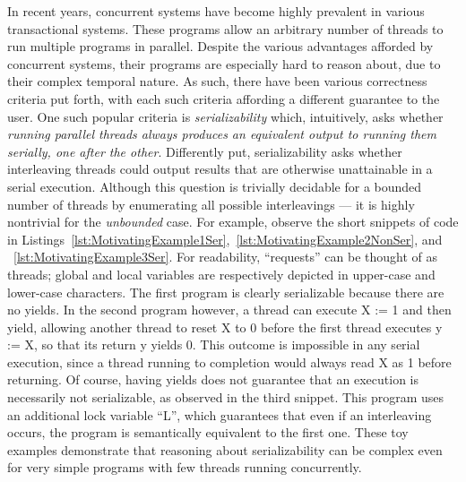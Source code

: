 In recent years, concurrent systems have become highly prevalent in various transactional systems. These programs allow an arbitrary number of threads to run multiple programs in parallel.
Despite the various advantages afforded by concurrent systems, their programs are especially hard to reason about, due to their complex temporal nature.
%
As such, there have been various correctness criteria put forth, with each such criteria affording a different guarantee to the user.
One such popular criteria is \textit{serializability} which, intuitively, asks whether \textit{running parallel threads always produces an equivalent output to running them serially, one after the other}. Differently put, serializability asks whether interleaving threads could output results that are otherwise unattainable in a serial execution.
%
Although this question is trivially decidable for a bounded number of threads by enumerating all possible interleavings --- it is highly nontrivial for the \textit{unbounded} case. For example, observe the short snippets of code in Listings~\ref{lst:MotivatingExample1Ser},~\ref{lst:MotivatingExample2NonSer}, and ~\ref{lst:MotivatingExample3Ser}. For readability, ``requests'' can be thought of as threads; global and local variables are respectively depicted in upper-case and lower-case characters.
%
The first program is clearly serializable because there are no yields. In the second program however, a thread can execute X := 1 and then yield, allowing another thread to reset X to 0 before the first thread executes y := X, so that its return y yields 0. This outcome is impossible in any serial execution, since a thread running to completion would always read X as 1 before returning.
Of course, having yields does not guarantee that an execution is necessarily not serializable, as observed in the third snippet. This program uses an additional lock variable ``L'', which guarantees that even if an interleaving occurs, the program is semantically equivalent to the first one.
%
These toy examples demonstrate that reasoning about serializability can be complex even for very simple programs with few threads running concurrently.
%


